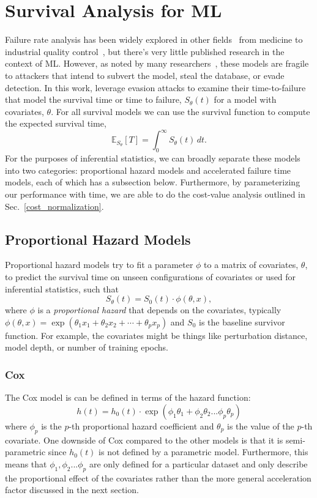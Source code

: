 
\section{Survival Analysis for ML} 
\label{afr_models}
Failure rate analysis has been widely explored in other fields~\citep{aft_models} from medicine to industrial quality control~\citep{ai_medical_imaging,ai_industry,ai_aviation,ai_luggage,ai_security,ai_prison}, but there's very little published research in the context of ML. However, as noted by many researchers~\citep{madry2017towards, carlini_towards_2017, croce_reliable_2020, meyers}, these models are fragile to attackers that intend to subvert the model, steal the database, or evade detection.  In this work, leverage evasion attacks to examine their time-to-failure   that model the survival time or time to failure, $S_{\theta}(t)$ for a model with covariates, $\theta$. For all survival models we can use the survival function to compute the expected survival time,
\[
	\mathbb{E}_{S_\theta}[T] = \int_0^{\infty}S_\theta(t) \,dt.
\]
For the purposes of inferential statistics, we can broadly separate these models into two categories: proportional hazard models and accelerated failure time models, each of which has a subsection below. Furthermore, by parameterizing our performance with time, we are able to do the cost-value analysis outlined in Sec.~\ref{cost_normalization}.

\subsection{Proportional Hazard Models}
Proportional hazard models try to fit a parameter $\phi$ to a matrix of covariates, $\theta$, to predict the survival time on unseen configurations of covariates or used for inferential statistics, such that
$$
S_\theta(t) = S_0(t) \cdot \phi(\theta, x), 
$$
where $\phi$ is a \textit{proportional hazard} that depends on the covariates, typically $\phi(\theta, x) = \exp{(\theta_1 x_1 + \theta_2 x_2 + \cdots + \theta_p x_p)}$ and $S_0$ is the baseline survivor function. For example, the covariates might be things like perturbation distance, model depth, or number of training epochs.


\subsubsection{Cox}
The Cox model is can be defined in terms of the hazard function:
$$
h(t) = h_0(t) \cdot \exp(\phi_1 \theta_1 + \phi_2 \theta_2... \phi_p \theta_p)
$$
where $\phi_p$ is the $p$-th proportional hazard coefficient and $\theta_p$ is the value of the $p$-th covariate. One downside of Cox compared to the other models is that it is semi-parametric since $h_0(t)$ is not defined by a parametric model. Furthermore, this means that $\phi_1, \phi_2... \phi_p$ are only defined for a particular dataset and only describe the proportional effect of the covariates rather than the more general acceleration factor discussed in the next section.


